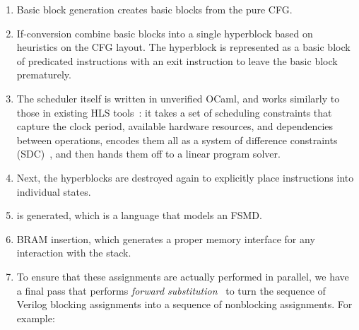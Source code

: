 \begin{enumerate}[label=\protect\blacknum{\arabic*}]
\item Basic block generation creates basic blocks from the pure \rtl{}
  \gls{CFG}.
\item If-conversion combine basic blocks into a single hyperblock based on
  heuristics on the \gls{CFG} layout.  The hyperblock is represented as a basic
  block of predicated instructions with an exit instruction to leave the basic
  block prematurely.
\item The scheduler itself is written in unverified OCaml, and works similarly
  to those in existing HLS tools~\cite[]{canis13_l}: it takes a set of
  scheduling constraints that capture the clock period, available hardware
  resources, and dependencies between operations, encodes them all as a system
  of difference constraints (SDC)~\cite[]{cong06_sdc}, and then hands them off
  to a linear program solver.
\item Next, the hyperblocks are destroyed again to explicitly place instructions
  into individual states.
\item \htl{} is generated, which is a language that models an \gls{FSMD}.
\item \gls{BRAM} insertion, which generates a proper memory interface for any
  interaction with the stack.
\item To ensure that these assignments are actually performed in parallel, we
  have a final pass that performs \emph{forward
    substitution}~\cite[p.~109]{hopwood78_decom} to turn the sequence of Verilog
  blocking assignments into a sequence of nonblocking assignments. For example:
%
\begin{center}
\end{center}
\end{enumerate}
